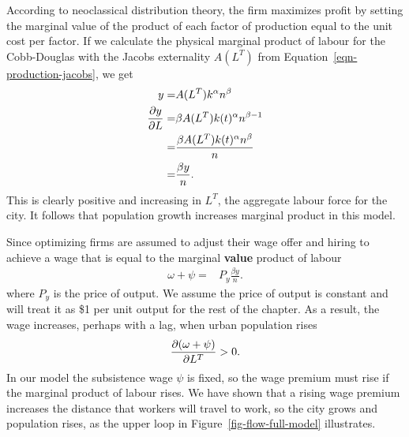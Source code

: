 According to \gls{neoclassical distribution theory}, the firm maximizes profit by setting the marginal value of the product of each \gls{factor of production} equal to the unit cost per factor. %
If we calculate the physical marginal product of labour for the Cobb-Douglas with the Jacobs externality $A(L^T)$ from Equation~\ref{eqn-production-jacobs}, we get 
\begin{align}\label{eqn-model-MPL}
y              =&  A(L^T) k^\alpha n^\beta \nonumber\\ 
\frac{\partial y}{\partial L}     =&\beta A(L^T) k(t)^\alpha n^{\beta-1} \nonumber\\
                =&\frac{\beta A(L^T) k(t)^\alpha n^\beta}{n} \nonumber\\
                =& \frac{\beta y}{n}.
\end{align}
This is clearly positive and increasing in $L^T$, the aggregate labour force for the city.  It follows that population growth increases marginal product in this model. 


Since optimizing firms are assumed to adjust their wage offer and hiring to achieve a wage that is equal to the  marginal \textbf{value} product of labour 
\begin{align}\label{eqn-model-MPL-w}
             \omega + \psi   =& P_y\frac{\beta y}{n}.
\end{align}
where $P_y$ is the price of output. We assume the price of output is constant and will treat it as \$1 per unit output for the rest of the chapter. As a result, the wage increases, perhaps with a lag, when urban population  rises 
\begin{equation}
 \frac{\partial (\omega + \psi)}{\partial L^T} >0.
\label{eqn-wage-population}
\end{equation}
In our model the subsistence wage $\psi$ is fixed, so the wage premium must rise if the marginal product of labour rises.  We have shown that a rising wage premium increases the distance that workers will travel to work, so the city grows and population rises, as the upper loop in Figure~\ref{fig-flow-full-model} illustrates. 

 

